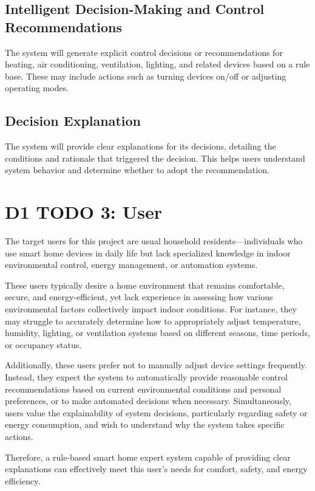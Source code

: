 \documentclass{article}
\begin{document}
\subsection{Intelligent Decision-Making and Control Recommendations}

The system will generate explicit control decisions or recommendations for heating, air conditioning, ventilation, lighting, and related devices based on a rule base. These may include actions such as turning devices on/off or adjusting operating modes.

\subsection{Decision Explanation}

The system will provide clear explanations for its decisions, detailing the conditions and rationale that triggered the decision. This helps users understand system behavior and determine whether to adopt the recommendation.

\section{D1 TODO 3: User}

The target users for this project are usual household residents—individuals who use smart home devices in daily life but lack specialized knowledge in indoor environmental control, energy management, or automation systems.

These users typically desire a home environment that remains comfortable, secure, and energy-efficient, yet lack experience in assessing how various environmental factors collectively impact indoor conditions. For instance, they may struggle to accurately determine how to appropriately adjust temperature, humidity, lighting, or ventilation systems based on different seasons, time periods, or occupancy status.

Additionally, these users prefer not to manually adjust device settings frequently. Instead, they expect the system to automatically provide reasonable control recommendations based on current environmental conditions and personal preferences, or to make automated decisions when necessary. Simultaneously, users value the explainability of system decisions, particularly regarding safety or energy consumption, and wish to understand why the system takes specific actions.

Therefore, a rule-based smart home expert system capable of providing clear explanations can effectively meet this user's needs for comfort, safety, and energy efficiency.
\end{document}
